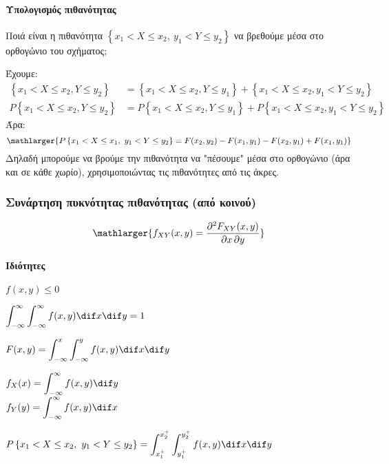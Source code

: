 \documentclass[11pt,a4paper,notitlepage,fleqn,final]{article}
\begin{document}
	\paragraph{Υπολογισμός πιθανότητας}
	Ποιά είναι η πιθανότητα
	\( \left\lbrace x_1<X\leq x_2,\
	y_1<Y\leq y_2 \right\rbrace \)
	να βρεθούμε μέσα στο ορθογώνιο του σχήματος;
	
	Έχουμε:
	\begin{align*}
	\left\lbrace x_1<X\leq x_2,Y\leq y_2 \right\rbrace
	&= \left\lbrace x_1<X\leq x_2, Y\leq y_1 \right\rbrace
	+ \left\lbrace x_1<X\leq x_2,y_1<Y\leq y_2 \right\rbrace
	\\
	P\left\lbrace x_1<X\leq x_2,Y\leq y_2 \right\rbrace
	&= P\left\lbrace x_1<X\leq x_2, Y\leq y_1 \right\rbrace
	+ P \left\lbrace x_1<X\leq x_2,y_1<Y\leq y_2 \right\rbrace
	\end{align*}
	Άρα:
	\[
	\mathlarger{
		P \left\lbrace x_1<X\leq x_1,\ y_1<Y\leq y_2 \right\rbrace
		= F(x_2,y_2) - F(x_1,y_1) - F(x_2,y_1) + F(x_1,y_1)
	}
	\]
	Δηλαδή μπορούμε να βρούμε την πιθανότητα να "πέσουμε" μέσα στο
	ορθογώνιο (άρα και σε κάθε χωρίο), χρησιμοποιώντας τις 
	πιθανότητες από τις άκρες.
	
	\subsubsection{Συνάρτηση πυκνότητας πιθανότητας (από κοινού)}
	\[
	\mathlarger{f_{XY}(x,y)
			= \frac{\partial^2 F_{XY}(x,y)}{\partial x\,\partial y}
			}
	\]
	
	\paragraph{Ιδιότητες}
	\begin{enumroman}
		\item \( f(x,y) \leq 0 \)
		\item \( \displaystyle
		\int_{-\infty}^{\infty} \int_{-\infty}^{\infty} f(x,y)\dif x
		\dif y = 1
		 \)
		\item \( \displaystyle
		F(x,y) = \int_{-\infty}^{x}\int_{-\infty}^{y} f(x,y)\dif x\dif y
		 \)
		\item \( \displaystyle
		f_X(x) = \int_{-\infty}^{\infty} f(x,y)\dif y \) \\
		\( \displaystyle
		f_Y(y) = \int_{-\infty}^{\infty} f(x,y)\dif x \)
		\item \( \displaystyle
		P\left\lbrace x_1<X\leq x_2,\ y_1<Y\leq y_2 \right\rbrace
		= \int_{x_1^+}^{x_2^+} \int_{y_1^+}^{y_2^+} f(x,y)\dif x\dif y
		 \)
	\end{enumroman}
	
\end{document}
